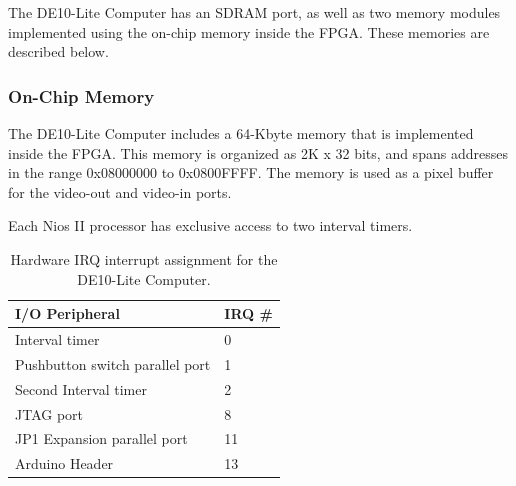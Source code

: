 \documentclass[11pt, twoside, pdftex]{article}
\newcommand{\commonFiles}{../../../common/doc}
\begin{document}
The DE10-Lite Computer has an SDRAM port, as well as two memory modules implemented 
using the on-chip memory inside the FPGA. These memories are described below.



\subsubsection{On-Chip Memory}
The DE10-Lite Computer includes a 64-Kbyte memory that is implemented inside the FPGA.  This 
memory is organized as 2K {\sf x} 32 bits, and spans addresses in the range 
{\sf 0x08000000} to {\sf 0x0800FFFF}. The memory is used as a pixel buffer for the
video-out and video-in ports.
















Each Nios II processor has exclusive access to two interval timers.






\begin{table}[h]
    \begin{center}
    \begin{tabular}{l|l}
            \textbf{I/O Peripheral} &
            \textbf{IRQ \#}
        \\\hline
            Interval timer & 0 \\
            Pushbutton switch parallel port & 1 \\
            Second Interval timer & 2 \\
            JTAG port & 8 \\
            JP1 Expansion parallel port & 11 \\
           	Arduino Header & 13 \\
    \end{tabular}
    \caption{Hardware IRQ interrupt assignment for the DE10-Lite Computer.}
	 \label{tab:irq}
    \end{center}
\end{table}
\end{document}
